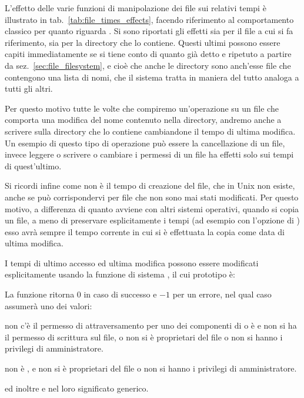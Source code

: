 L'effetto delle varie funzioni di manipolazione dei file sui relativi tempi è
illustrato in tab.~\ref{tab:file_times_effects}, facendo riferimento al
comportamento classico per quanto riguarda . Si sono riportati
gli effetti sia per il file a cui si fa riferimento, sia per la directory che
lo contiene. Questi ultimi possono essere capiti immediatamente se si tiene
conto di quanto già detto e ripetuto a partire da
sez.~\ref{sec:file_filesystem}, e cioè che anche le directory sono anch'esse
file che contengono una lista di nomi, che il sistema tratta in maniera del
tutto analoga a tutti gli altri.

Per questo motivo tutte le volte che compiremo un'operazione su un file che
comporta una modifica del nome contenuto nella directory, andremo anche a
scrivere sulla directory che lo contiene cambiandone il tempo di ultima
modifica. Un esempio di questo tipo di operazione può essere la cancellazione
di un file, invece leggere o scrivere o cambiare i permessi di un file ha
effetti solo sui tempi di quest'ultimo.

Si ricordi infine come  non è il tempo di creazione del file,
che in Unix non esiste, anche se può corrispondervi per file che non sono mai
stati modificati. Per questo motivo, a differenza di quanto avviene con altri
sistemi operativi, quando si copia un file, a meno di preservare
esplicitamente i tempi (ad esempio con l'opzione  di ) esso
avrà sempre il tempo corrente in cui si è effettuata la copia come data di
ultima modifica.

I tempi di ultimo accesso ed ultima modifica possono essere modificati
esplicitamente usando la funzione di sistema , il cui prototipo
è:

\begin{funcproto}{
}

{La funzione ritorna $0$ in caso di successo e $-1$ per un errore, nel qual
  caso  assumerà uno dei valori: 
  \begin{errlist}
  \item[\errcode{EACCES}] non c'è il permesso di attraversamento per uno dei
    componenti di  o  è  e non si ha il
    permesso di scrittura sul file, o non si è proprietari del file o non si
    hanno i privilegi di amministratore.
  \item[\errcode{EPERM}]  non è , e non si è
    proprietari del file o non si hanno i privilegi di amministratore.
  \end{errlist}
  ed inoltre  e  nel loro significato generico.}
\end{funcproto}

